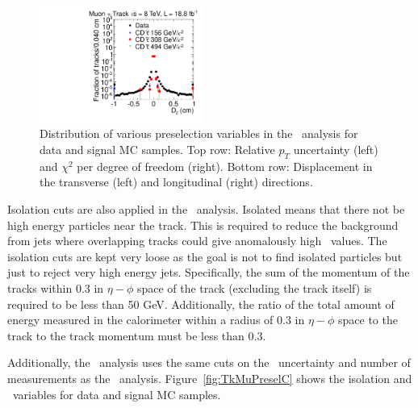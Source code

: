 \begin{figure}
  \includegraphics[clip=false, trim=0.0cm 0cm 0.0cm 0cm, width=0.48\textwidth]{figures/tkmu/Selection_Comp_8TeV_GMStau_Dz_BS}
  \caption[Distribution of relative \pt\ uncertainty, $\chi^2$ per degree of freedom, and transverse and longitudinal
displacement in the \tktof\ analysis for data and signal MC samples.]
{Distribution of various preselection variables in the \tktof\ analysis for data and signal MC samples.
Top row: Relative $p_T$ uncertainty (left) and $\chi^2$ per degree of freedom (right).
Bottom row: Displacement in the transverse (left) and longitudinal (right) directions.}
    \label{fig:TkMuPreselB}
\end{figure}

Isolation cuts are also applied in the \tktof\ analysis. Isolated means that there not be high energy particles near the track.
This is required to reduce the background from jets where overlapping tracks could give
anomalously high \dedx\ values. The isolation cuts are kept very loose as the goal is not to find isolated particles but just to reject very high energy jets.
Specifically, the sum of the momentum of the tracks within 0.3 in $\eta-\phi$ 
space of the track (excluding the track itself) is required to be less than 50 GeV. Additionally, the ratio of the total
amount of energy measured in the calorimeter within a radius of 0.3 in $\eta-\phi$ space to the track to the track momentum must be less than 0.3.

Additionally, the \tktof\ analysis uses the same cuts on the \invbeta\ uncertainty and number of measurements as the \muononly\ analysis.
Figure~\ref{fig:TkMuPreselC} shows the isolation and \invbeta\ variables for data and signal MC samples.

